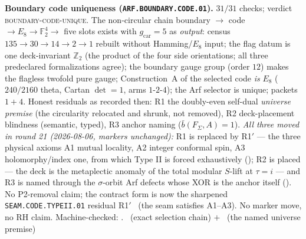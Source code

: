 \documentclass[11pt,a4paper]{article}
\newcommand{\gcar}{g_{\mathrm{car}}}
\newcommand{\Z}{\mathbb{Z}}
\theoremstyle{definition}
\begin{document}
\par\smallskip\noindent\textbf{Boundary code uniqueness
(\texttt{ARF.BOUNDARY.CODE.01}).}
$31/31$ checks; verdict \textsc{boundary-code-unique}.  The
non-circular chain boundary $\to$ code $\to E_8\to\mathbb
F_2^4\to$ five slots exists with $\gcar=5$ as \emph{output}:
census $135\to30\to14\to2\to1$ rebuilt without Hamming/$E_8$
input; the flag datum is one deck-invariant $\Z_2$ (the product of
the four side orientations; all three predeclared formalizations
agree); the boundary gauge group (order $12$) makes the flagless
twofold pure gauge; Construction~A of the selected code \emph{is}
$E_8$ ($240/2160$ theta, Cartan $\det=1$, arms $1$-$2$-$4$); the
Arf selector is unique; packets $1+4$.  Honest residuals as
recorded then: R1 the doubly-even self-dual \emph{universe premise}
(the circularity relocated and shrunk, not removed), R2
deck-placement blindness (semantic, typed), R3 anchor naming
($\bar b(F_\Sigma,A)=1$).  \emph{All three moved in round 21
(2026-08-06, markers unchanged):} R1 is replaced by R1$'$ --- the
three physical axioms A1 mutual locality, A2 integer conformal
spin, A3 holomorphy/index one, from which Type II is forced
exhaustively (); R2 is placed
--- the deck is the metaplectic anomaly of the total modular
$S$-lift at $\tau=i$ --- and R3 is named through the
$\sigma$-orbit Arf defects whose XOR is the anchor itself
().  No P2-removal
claim; the contract form is now the sharpened
\texttt{SEAM.CODE.TYPEII.01} residual R1$'$ \mC\ (the seam
satisfies A1--A3).  No marker move, no RH claim.
Machine-checked: .
\mE\ (exact selection chain) $+$ \mO\ (the named universe premise)
\par\smallskip
\end{document}
